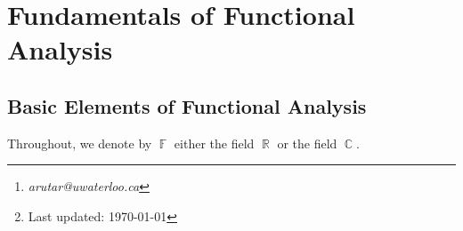 \documentclass[11pt, a4paper]{memoir}
\title{\subject}
\author{Alex Rutar\thanks{\itshape arutar@uwaterloo.ca}\\ University of Waterloo}
\date{\semester\thanks{Last updated: \today}}
\DeclareMathOperator{\R}{{\mathbb{R}}}
\DeclareMathOperator{\C}{{\mathbb{C}}}
\DeclareMathOperator{\F}{{\mathbb{F}}}
\theoremstyle{change}
\theoremstyle{plain}
\theoremstyle{nonumberplain}
\numberwithin{equation}{section}
\begin{document}
\hypersetup{pageanchor=false}
\maketitle
\newpage
\frontmatter
\hypersetup{pageanchor=true}
\tableofcontents*
\newpage
\mainmatter


\chapter{Fundamentals of Functional Analysis}
\section{Basic Elements of Functional Analysis}
Throughout, we denote by $\F$ either the field $\R$ or the field $\C$.
\end{document}
